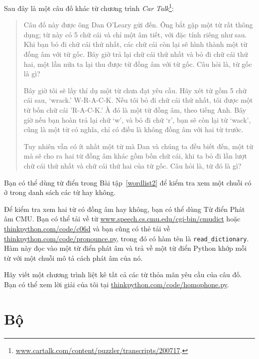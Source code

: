 \documentclass[11pt]{book}
\begin{document}
\begin{ex}

Sau đây là một câu đố khác từ chương trình {\em Car
Talk}\footnote{\url{www.cartalk.com/content/puzzler/transcripts/200717}.}:

\begin{quote}
Câu đố này được ông Dan O'Leary gửi đến. Ông bắt gặp một từ rất thông dụng;
từ này có 5 chữ cái và chỉ một âm tiết, với đặc tính riêng như sau.
Khi bạn bỏ đi chữ cái thứ nhất, các chữ cái còn lại sẽ hình thành một
từ đồng âm với từ gốc. Bây giờ trả lại chữ cái thứ nhất và bỏ đi chữ cái
thứ hai, một lần nữa ta lại thu  được từ đồng âm với từ gốc. Câu hỏi là,
từ gốc là gì?

Bây giờ tôi sẽ lấy thí dụ một từ chưa đạt yêu cầu. Hãy xét từ gồm 5 chữ cái
sau, `wrack.' W-R-A-C-K. Nếu tôi bỏ đi chữ cái thứ nhất, tôi được một từ
bốn chữ cái 'R-A-C-K.' À đó là một từ đồng âm, theo tiếng Anh. Bây giờ
nếu bạn hoàn trả lại chữ `w', và bỏ đi chữ `r', bạn sẽ còn lại từ
`wack', cũng là một từ có nghĩa, chỉ có điều là không đồng âm với hai
từ trước.

Tuy nhiên vẫn có ít nhất một từ mà Dan và chúng ta đều biết đến, một từ
mà sẽ cho ra hai từ đồng âm khác gồm bốn chữ cái, khi ta bỏ đi lần lượt chữ cái thứ nhất
và chữ cái thứ hai của từ gốc. Câu hỏi là, từ đó là gì?
\end{quote}


Bạn có thể dùng từ điển trong Bài tập~\ref{wordlist2} để kiểm tra xem 
một chuỗi có ở trong danh sách các từ hay không.

Để kiểm tra xem hai từ có đồng âm hay không, bạn có thể dùng
Từ điển Phát âm CMU. Bạn có thể tải về từ 
\url{www.speech.cs.cmu.edu/cgi-bin/cmudict} hoặc
\url{thinkpython.com/code/c06d} và bạn cũng có thẻ tải về
\url{thinkpython.com/code/pronounce.py}, trong đó có hàm
tên là \verb"read_dictionary". Hàm này đọc vào một từ điển phát âm và
trả về một từ điển Python khớp mỗi từ với một chuỗi
mô tả cách phát âm của nó.

Hãy viết một chương trình liệt kê tất cả các từ thỏa mãn yêu cầu
của câu đố. Bạn có thể xem lời giải của tôi tại \url{thinkpython.com/code/homophone.py}.

\end{ex}



\chapter{Bộ}
\label{tuplechap}
\end{document}
